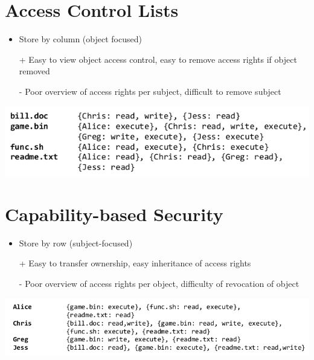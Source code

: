 \documentclass{article}[18pt]
\begin{document}
\section{Access Control Lists}
\begin{itemize}
	\item Store by column (object focused)
	\item [+] Easy to view object access control, easy to remove access rights if object removed
	\item [-] Poor overview of access rights per subject, difficult to remove subject
\end{itemize}
\begin{center}
	\includegraphics[scale=0.7]{ACL}
\end{center}
\section{Capability-based Security}
\begin{itemize}
	\item Store by row (subject-focused)
	\item [+] Easy to transfer ownership, easy inheritance of access rights
	\item [-] Poor overview of access rights per object, difficulty of revocation of object
\end{itemize}
\begin{center}
	\includegraphics[scale=0.7]{capability}
\end{center}
\end{document}
